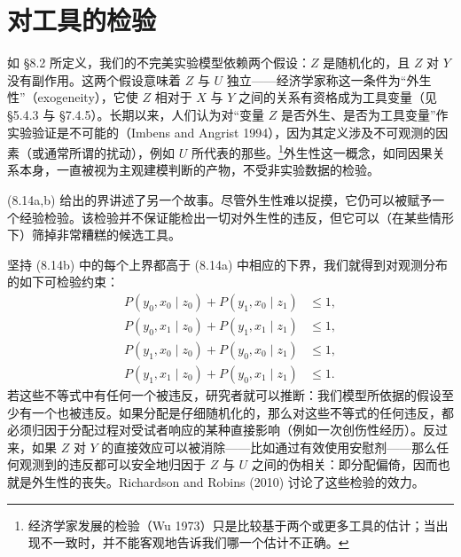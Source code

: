 \providecommand{\ACE}{\mathrm{ACE}}
\providecommand{\ETT}{\mathrm{ETT}}
\providecommand{\ghist}[6]{%
\begin{scope}[shift={(#3,#4)},scale=#6]
  \draw[->,thin] (-1.15,0)--(1.15,0);
  \foreach \i in {0,...,24}{%
    \pgfmathsetmacro{\xx}{-1+(\i+0.5)*0.08}%
    \pgfmathsetmacro{\hh}{0.95*exp(-((\xx-(#1))*(\xx-(#1)))/(2*(#2)*(#2)))}%
    \fill[black!72] (\xx-0.032,0) rectangle (\xx+0.032,\hh);
  }
\end{scope}
\node[font=\scriptsize] at (#3,#4-0.8) {(#5)};
}

\section{对工具的检验}

如 \S 8.2 所定义，我们的不完美实验模型依赖两个假设：$Z$ 是随机化的，且 $Z$ 对 $Y$ 没有副作用。这两个假设意味着 $Z$ 与 $U$ 独立——经济学家称这一条件为“外生性”（exogeneity），它使 $Z$ 相对于 $X$ 与 $Y$ 之间的关系有资格成为工具变量（见 \S 5.4.3 与 \S 7.4.5）。长期以来，人们认为对“变量 $Z$ 是否外生、是否为工具变量”作实验验证是不可能的（Imbens and Angrist 1994），因为其定义涉及不可观测的因素（或通常所谓的扰动），例如 $U$ 所代表的那些。\footnote{经济学家发展的检验（Wu 1973）只是比较基于两个或更多工具的估计；当出现不一致时，并不能客观地告诉我们哪一个估计不正确。}外生性这一概念，如同因果关系本身，一直被视为主观建模判断的产物，不受非实验数据的检验。

\textup{(8.14a,b)} 给出的界讲述了另一个故事。尽管外生性难以捉摸，它仍可以被赋予一个经验检验。该检验并不保证能检出一切对外生性的违反，但它可以（在某些情形下）筛掉非常糟糕的候选工具。

坚持 \textup{(8.14b)} 中的每个上界都高于 \textup{(8.14a)} 中相应的下界，我们就得到对观测分布的如下可检验约束：
\begin{equation}
\begin{aligned}
P(y_0,x_0\mid z_0)+P(y_1,x_0\mid z_1)&\le 1,\\
P(y_0,x_1\mid z_0)+P(y_1,x_1\mid z_1)&\le 1,\\
P(y_1,x_0\mid z_0)+P(y_0,x_0\mid z_1)&\le 1,\\
P(y_1,x_1\mid z_0)+P(y_0,x_1\mid z_1)&\le 1.
\end{aligned} \tag{8.21}
\end{equation}
若这些不等式中有任何一个被违反，研究者就可以推断：我们模型所依据的假设至少有一个也被违反。如果分配是仔细随机化的，那么对这些不等式的任何违反，都必须归因于分配过程对受试者响应的某种直接影响（例如一次创伤性经历）。反过来，如果 $Z$ 对 $Y$ 的直接效应可以被消除——比如通过有效使用安慰剂——那么任何观测到的违反都可以安全地归因于 $Z$ 与 $U$ 之间的伪相关：即分配偏倚，因而也就是外生性的丧失。Richardson and Robins (2010) 讨论了这些检验的效力。

